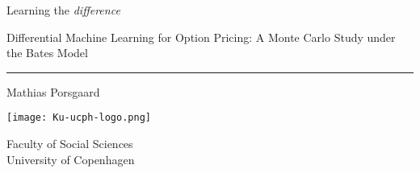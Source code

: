 \begin{titlepage}
    \begin{center}
        \vspace*{1cm}
            
        \Huge
        Learning the \emph{difference}
        \vspace{0.5cm}

        \huge 
        Differential Machine Learning for Option Pricing: A Monte Carlo Study under the Bates Model 

        \hrule
        \vspace{-1.0cm}
        \LARGE
        
            
        \vspace{1.5cm}
            
        Mathias Porsgaard
            
        \vfill
            
        \vspace{0.8cm}
            
        \texttt{[image: Ku-ucph-logo.png]}
            
        \Large
        Faculty of Social Sciences\\
        University of Copenhagen
            
    \end{center}
\end{titlepage}